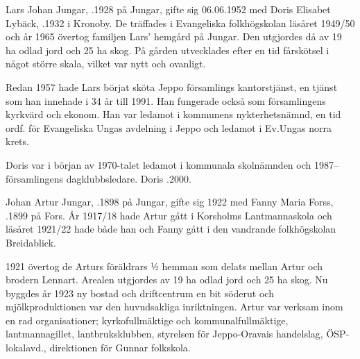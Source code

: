 %
Lars Johan Jungar, .1928 på Jungar, gifte sig 06.06.1952 med Doris Elisabet Lybäck, .1932 i Kronoby. De träffades i Evangeliska folkhögskolan läsåret 1949/50 och år 1965 övertog familjen Lars' hemgård på Jungar. Den utgjordes då av 19 ha odlad jord och 25 ha skog. På gården utvecklades efter en tid fårskötsel i något större skala, vilket var nytt och ovanligt.

Redan 1957 hade Lars börjat sköta Jeppo församlings kantorstjänst, en tjänst som han innehade i 34 år till 1991. Han fungerade också som församlingens kyrkvärd och ekonom. Han var ledamot i kommunens nykterhetsnämnd, en tid ordf. för Evangeliska Ungas avdelning i Jeppo och ledamot i Ev.Ungas norra krets.

Doris var i början av 1970-talet ledamot i kommunala skolnämnden och 1987-- församlingens dagklubbsledare. Doris .2000.
\begin{jhchildren}
  \item {}
  \item {}
  \item {}
\end{jhchildren}



%
Johan Artur Jungar, .1898 på Jungar, gifte sig 1922  med Fanny Maria Forss, .1899 på Fors. År 1917/18 hade Artur gått i Korsholms Lantmannaskola och läsåret 1921/22 hade både han och Fanny gått i den vandrande folkhögskolan Breidablick.

1921 övertog de Arturs föräldrars ½  hemman som delats mellan Artur och brodern Lennart. Arealen utgjordes av 19 ha odlad jord och 25 ha skog. Nu byggdes år 1923 ny bostad och driftcentrum en bit söderut och mjölkproduktionen var den huvudsakliga inriktningen. Artur var verksam inom en rad organisationer; kyrkofullmäktige och kommunalfullmäktige, lantmannagillet, lantbruksklubben, styrelsen för Jeppo-Oravais handelslag, ÖSP-lokalavd., direktionen för Gunnar folkskola.

